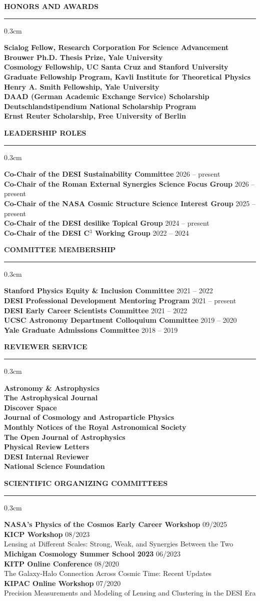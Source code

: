 \documentclass[12pt]{article}
\renewenvironment{section}[1]
  {
  \medskip
  {\color{aublue} \MakeUppercase{\bf #1}}
  \smallskip
  \hrule
  \medskip
  \begin{adjustwidth}{0.3cm}{}
  }
  {
  \end{adjustwidth}
  }
\newcommand{\entry}[3]{{\bf #1} \hfill {#2} \\ {#3}}
\begin{document}
\begin{section}{Honors and Awards}
  \entry{Scialog Fellow, Research Corporation For Science Advancement}{}{}
  \entry{Brouwer Ph.D. Thesis Prize, Yale University}{}{}
  \entry{Cosmology Fellowship, UC Santa Cruz and Stanford University}{}{}
  \entry{Graduate Fellowship Program, Kavli Institute for Theoretical Physics}{}{}
  \entry{Henry A. Smith Fellowship, Yale University}{}{}
  \entry{DAAD (German Academic Exchange Service) Scholarship}{}{}
  \entry{Deutschlandstipendium National Scholarship Program}{}{}
  \entry{Ernst Reuter Scholarship, Free University of Berlin}{}{}
\end{section}

\begin{section}{Leadership Roles}
  \entry{Co-Chair of the DESI Sustainability Committee}{2026 -- present}{}
  \entry{Co-Chair of the Roman External Synergies Science Focus Group}{2026 -- present}{}
  \entry{Co-Chair of the NASA Cosmic Structure Science Interest Group}{2025 -- present}{}
  \entry{Co-Chair of the DESI desilike Topical Group}{2024 -- present}{}
  \entry{Co-Chair of the DESI C$^3$ Working Group}{2022 -- 2024}{}
\end{section}

\begin{section}{Committee Membership}
  \entry{Stanford Physics Equity \& Inclusion Committee}{2021 -- 2022}{}
  \entry{DESI Professional Development Mentoring Program}{2021 -- present}{}
  \entry{DESI Early Career Scientists Committee}{2021 -- 2022}{}
  \entry{UCSC Astronomy Department Colloquium Committee}{2019 -- 2020}{}
  \entry{Yale Graduate Admissions Committee}{2018 -- 2019}{}
\end{section}

\begin{section}{Reviewer Service}
  \entry{Astronomy \& Astrophysics}{}{}
  \entry{The Astrophysical Journal}{}{}
  \entry{Discover Space}{}{}
  \entry{Journal of Cosmology and Astroparticle Physics}{}{}
  \entry{Monthly Notices of the Royal Astronomical Society}{}{}
  \entry{The Open Journal of Astrophysics}{}{}
  \entry{Physical Review Letters}{}{}
  \entry{DESI Internal Reviewer}{}{}
  \entry{National Science Foundation}{}{}
\end{section}

\begin{section}{Scientific Organizing Committees}
  \entry{NASA's Physics of the Cosmos Early Career Workshop}{09/2025}{}
  \entry{KICP Workshop}{08/2023}{Lensing at Different Scales: Strong, Weak, and Synergies Between the Two} \\
  \entry{Michigan Cosmology Summer School 2023}{06/2023}{}
  \entry{KITP Online Conference}{08/2020}{The Galaxy-Halo Connection Across Cosmic Time: Recent Updates}\\
  \entry{KIPAC Online Workshop}{07/2020}{Precision Measurements and Modeling of Lensing and Clustering in the DESI Era}
\end{section}
\end{document}
